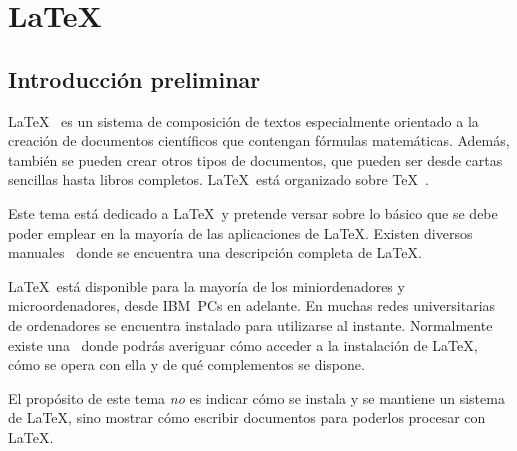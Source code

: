
\chapter{\LaTeX}
\label{latex.tex}

\index{\LaTeX}

\section{Introducción preliminar}

\LaTeX~\cite{llmanual}  es   un  sistema  de  composición   de  textos
especialmente orientado  a la  creación de documentos  científicos que
contengan fórmulas matemáticas. Además,  también se pueden crear otros
tipos  de documentos,  que  pueden ser  desde  cartas sencillas  hasta
libros completos. \LaTeX\ está organizado sobre \TeX~\cite{texbook}.

Este tema  está dedicado a \LaTeX\  y pretende versar sobre  lo básico
que se debe poder emplear en la mayoría de las aplicaciones de \LaTeX.
Existen diversos manuales~\cite{llmanual,companion} donde se encuentra
una descripción completa de \LaTeX.

\LaTeX\  está  disponible  para  la  mayoría  de  los  miniordenadores
y  microordenadores,  desde  IBM~PCs  en  adelante.  En  muchas  redes
universitarias de  ordenadores se encuentra instalado  para utilizarse
al instante. Normalmente existe una \guialatex\ donde podrás averiguar
cómo acceder a la  instalación de \LaTeX, cómo se opera  con ella y de
qué complementos se dispone.

El propósito  de este tema \emph{no}  es indicar cómo se  instala y se
mantiene un sistema  de \LaTeX, sino mostrar  cómo escribir documentos
para poderlos procesar con \LaTeX.


